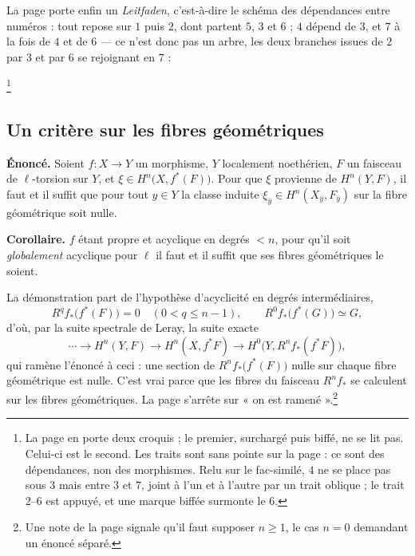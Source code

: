 \documentclass[11pt,a4paper]{article}
\begin{document}
La page porte enfin un \emph{Leitfaden}, c'est-à-dire le schéma des
dépendances entre numéros : tout repose sur $1$ puis $2$, dont partent $5$,
$3$ et $6$ ; $4$ dépend de $3$, et $7$ à la fois de $4$ et de $6$ --- ce n'est
donc pas un arbre, les deux branches issues de $2$ par $3$ et par $6$ se
rejoignant en $7$ :


\footnote{La page en porte deux croquis ; le premier, surchargé puis biffé, ne
se lit pas. Celui-ci est le second. Les traits sont sans pointe sur la page :
ce sont des dépendances, non des morphismes. Relu sur le fac-similé, $4$ ne se
place pas sous $3$ mais entre $3$ et $7$, joint à l'un et à l'autre par un
trait oblique ; le trait $2$--$6$ est appuyé, et une marque biffée surmonte le
$6$.}

\subsection*{Un critère sur les fibres géométriques}

\textbf{Énoncé.} Soient $f : X \to Y$ un morphisme, $Y$ localement noethérien,
$F$ un faisceau de $\ell$-torsion sur $Y$, et
$\xi \in H^{n}\bigl( X, f^{*}(F) \bigr)$. Pour que $\xi$ provienne de
$H^{n}(Y, F)$, il faut et il suffit que pour tout $y \in Y$ la classe induite
$\xi_{\bar{y}} \in H^{n}(X_{\bar{y}}, F_{\bar{y}})$ sur la fibre géométrique
soit nulle.

\textbf{Corollaire.} $f$ étant propre et acyclique en degrés $< n$, pour qu'il
soit \emph{globalement} acyclique pour $\ell$ il faut et il suffit que ses
fibres géométriques le soient.

La démonstration part de l'hypothèse d'acyclicité en degrés intermédiaires,
\[
  R^{q} f_{*}\bigl( f^{*}(F) \bigr) = 0 \quad (0 < q \leqslant n-1) ,
  \qquad R^{0} f_{*}\bigl( f^{*}(G) \bigr) \simeq G ,
\]
d'où, par la suite spectrale de Leray, la suite exacte
\[
  \cdots \longrightarrow H^{n}(Y, F) \longrightarrow H^{n}(X, f^{*}F)
  \longrightarrow H^{0}\bigl( Y, R^{n} f_{*}(f^{*}F) \bigr) ,
\]
qui ramène l'énoncé à ceci : une section de $R^{n} f_{*}\bigl( f^{*}(F)
\bigr)$ nulle sur chaque fibre géométrique est nulle. C'est vrai parce que les
fibres du faisceau $R^{n}f_{*}$ se calculent sur les fibres géométriques. La
page s'arrête sur « on est ramené ».\footnote{Une note de la page signale
qu'il faut supposer $n \geqslant 1$, le cas $n = 0$ demandant un énoncé
séparé.}
\end{document}
